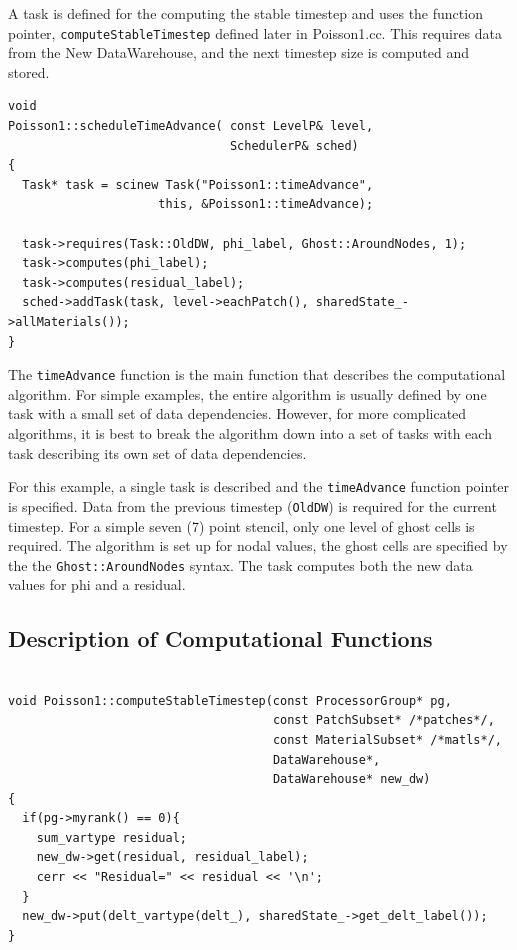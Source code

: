 \documentclass[12pt]{report}
\begin{document}
A task is defined for the computing the stable timestep and uses the
function pointer, \texttt{computeStableTimestep} defined later in
Poisson1.cc.  This requires data from the New DataWarehouse, and the
next timestep size is computed and stored.

\begin{Verbatim}[fontsize=\footnotesize]
void
Poisson1::scheduleTimeAdvance( const LevelP& level,
                               SchedulerP& sched)
{
  Task* task = scinew Task("Poisson1::timeAdvance",
                     this, &Poisson1::timeAdvance);

  task->requires(Task::OldDW, phi_label, Ghost::AroundNodes, 1);
  task->computes(phi_label);
  task->computes(residual_label);
  sched->addTask(task, level->eachPatch(), sharedState_->allMaterials());
}
\end{Verbatim}

The \texttt{timeAdvance} function is the main function that describes
the computational algorithm.  For simple examples, the entire
algorithm is usually defined by one task with a small set of data
dependencies.  However, for more complicated algorithms, it is best to
break the algorithm down into a set of tasks with each task describing
its own set of data dependencies.

For this example, a single task is described and the
\texttt{timeAdvance} function pointer is specified.  Data from the
previous timestep (\texttt{OldDW}) is required for the current
timestep.  For a simple seven (7) point stencil, only one level of
ghost cells is required.  The algorithm is set up for nodal values,
the ghost cells are specified by the the \texttt{Ghost::AroundNodes}
syntax.  The task computes both the new data values for phi and a
residual.

\subsection{Description of Computational Functions}

\begin{Verbatim}[fontsize=\footnotesize]

void Poisson1::computeStableTimestep(const ProcessorGroup* pg,
                                     const PatchSubset* /*patches*/,
                                     const MaterialSubset* /*matls*/,
                                     DataWarehouse*,
                                     DataWarehouse* new_dw)
{
  if(pg->myrank() == 0){
    sum_vartype residual;
    new_dw->get(residual, residual_label);
    cerr << "Residual=" << residual << '\n';
  }
  new_dw->put(delt_vartype(delt_), sharedState_->get_delt_label());
}

\end{Verbatim}
\end{document}
